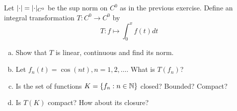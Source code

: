 \documentclass[a4paper, 12pt]{article}
\begin{document}
\begin{problem} 
Let $\lvert\cdot\rvert = \lvert\cdot\rvert_{C^0}$ be the sup norm on $C^0$ as in the previous exercise. Define an integral transformation $T: C^0 \to C^0$ by \[
    T: f \mapsto \int_{0 }^{x}f(t) dt
\]
\begin{enumerate} [(a)]
    \item Show that $T$ is linear, continuous and find its norm.
    \item Let $f_n(t) = \cos(nt), n = 1, 2, \dots$. What is $T(f_n)$?
    \item Is the set of functions $K = \{f_n : n \in \mathbb{N}\}$ closed? Bounded? Compact?
    \item Is $T(K)$ compact? How about its closure?
\end{enumerate}
\end{problem}
\end{document}
